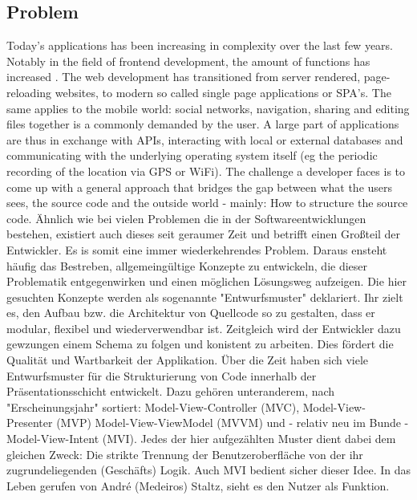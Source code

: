 \subsection{Problem}
\label{subsec:problem}

Today's applications has been increasing in complexity over the last few years.
Notably in the field of frontend development, the amount of functions has increased \cite{kevin2018}. The web development has transitioned from server rendered, 
page-reloading websites, to modern so called single page applications or SPA's.
The same applies to the mobile world: social networks, navigation, sharing and editing files together is a commonly demanded by the user.
A large part of applications are thus in exchange with APIs, interacting with local or external databases
and communicating with the underlying operating system itself (eg the periodic recording of the location via GPS or WiFi).
The challenge a developer faces is to come up with a general approach that bridges the gap between what the users sees, the source code
and the outside world - mainly: How to structure the source code. Ähnlich wie bei vielen Problemen die in der Softwareentwicklungen bestehen, existiert 
auch dieses seit geraumer Zeit und betrifft einen Großteil der Entwickler. Es is somit eine immer wiederkehrendes Problem. Daraus ensteht häufig das Bestreben, 
allgemeingültige Konzepte zu entwickeln, die dieser Problematik entgegenwirken und einen möglichen Lösungsweg aufzeigen. Die hier gesuchten Konzepte werden
als sogenannte "Entwurfsmuster" deklariert. Ihr zielt es, den Aufbau bzw. die Architektur von Quellcode so zu gestalten, dass er modular, flexibel und
wiederverwendbar ist. Zeitgleich wird der Entwickler dazu gewzungen einem Schema zu folgen und konistent zu arbeiten. Dies fördert die Qualität und
Wartbarkeit der Applikation. Über die Zeit haben sich viele Entwurfsmuster für die Strukturierung von Code innerhalb der Präsentationsschicht entwickelt. 
Dazu gehören unteranderem, nach "Erscheinungsjahr" sortiert: Model-View-Controller (MVC), Model-View-Presenter (MVP) Model-View-ViewModel (MVVM) und - relativ 
neu im Bunde - Model-View-Intent (MVI). Jedes der hier aufgezählten Muster dient dabei dem gleichen Zweck: Die strikte Trennung der Benutzeroberfläche von der ihr 
zugrundeliegenden (Geschäfts) Logik.
Auch MVI bedient sicher dieser Idee. In das Leben gerufen von André (Medeiros) Staltz, sieht es den Nutzer als Funktion.
